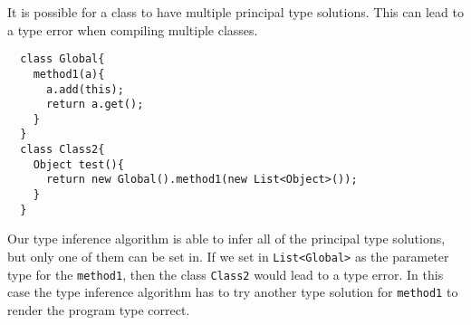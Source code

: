 It is possible for a class to have multiple principal type solutions.
This can lead to a type error when compiling multiple classes.
\begin{lstlisting}
  class Global{
    method1(a){
      a.add(this);
      return a.get();
    }
  }
  class Class2{
    Object test(){
      return new Global().method1(new List<Object>());
    }
  }
\end{lstlisting}
Our type inference algorithm is able to infer all of the principal type solutions, but only one of them can be set in.
If we set in \texttt{List<Global>} as the parameter type for the \texttt{method1},
then the class \texttt{Class2} would lead to a type error.
In this case the type inference algorithm has to try another type solution for \texttt{method1}
to render the program type correct.

\fi

